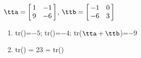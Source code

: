 {$\tta = \left[\hskip -3pt \begin{array}{cc} 1&-1\\  9&-6\end {array} \hskip -3pt
 \right]$,
 \quad
$\ttb = \left[\hskip -3pt \begin{array}{cc} -1&0\\  -6&3\end {array} \hskip -3pt
 \right]$
} 
{
\begin{enumerate}
\item		tr(\tta)=$-5$; tr(\ttb)=$-4$; tr($\tta+\ttb$)=$-9$
\item		tr(\tta\ttb) = 23 = tr(\ttb\tta)
\end{enumerate}
}



  

